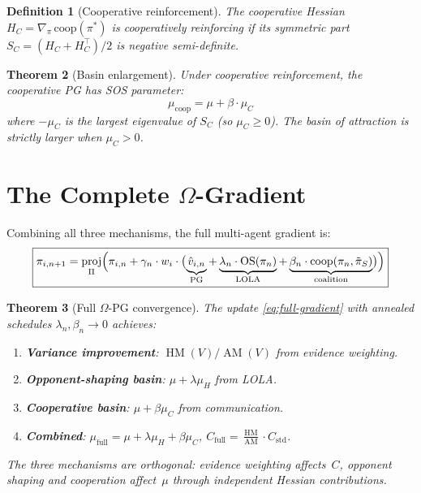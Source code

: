 \documentclass[11pt]{article}
\newtheorem{theorem}{Theorem}[section]
\newtheorem{definition}[theorem]{Definition}
\DeclareMathOperator{\proj}{proj}
\DeclareMathOperator{\HM}{HM}
\DeclareMathOperator{\AM}{AM}
\begin{document}
\begin{definition}[Cooperative reinforcement]
The cooperative Hessian $H_C = \nabla_\pi\,\text{coop}(\pi^*)$ is
\emph{cooperatively reinforcing} if its symmetric part
$S_C = (H_C + H_C^\top)/2$ is negative semi-definite.
\end{definition}

\begin{theorem}[Basin enlargement]\label{thm:coop-basin}
Under cooperative reinforcement, the cooperative PG has SOS parameter:
\begin{equation}
  \mu_{\text{coop}} = \mu + \beta \cdot \mu_C
\end{equation}
where $-\mu_C$ is the largest eigenvalue of $S_C$ (so $\mu_C \geq 0$).
The basin of attraction is strictly larger when $\mu_C > 0$.
\end{theorem}


\section{The Complete $\Omega$-Gradient}

Combining all three mechanisms, the full multi-agent gradient is:
\begin{equation}\label{eq:full-gradient}
  \boxed{
    \pi_{i,n+1} = \proj_\Pi\Bigl(\pi_{i,n} + \gamma_n \cdot w_i \cdot
    \bigl(\underbrace{\hat{v}_{i,n}}_{\text{PG}}
    + \underbrace{\lambda_n \cdot \text{OS}(\pi_n)}_{\text{LOLA}}
    + \underbrace{\beta_n \cdot \text{coop}(\pi_n, \tilde{\pi}_S)}_{\text{coalition}}\bigr)\Bigr)
  }
\end{equation}

\begin{theorem}[Full $\Omega$-PG convergence]\label{thm:full}
The update \eqref{eq:full-gradient} with annealed schedules
$\lambda_n, \beta_n \to 0$ achieves:
\begin{enumerate}
  \item \textbf{Variance improvement}: $\HM(V)/\AM(V)$ from evidence weighting.
  \item \textbf{Opponent-shaping basin}: $\mu + \lambda \mu_H$ from LOLA.
  \item \textbf{Cooperative basin}: $\mu + \beta \mu_C$ from communication.
  \item \textbf{Combined}: $\mu_{\text{full}} = \mu + \lambda \mu_H + \beta \mu_C$,
        $C_{\text{full}} = \frac{\HM}{\AM} \cdot C_{\text{std}}$.
\end{enumerate}
The three mechanisms are orthogonal: evidence weighting affects~$C$,
opponent shaping and cooperation affect~$\mu$ through independent
Hessian contributions.
\end{theorem}
\end{document}
